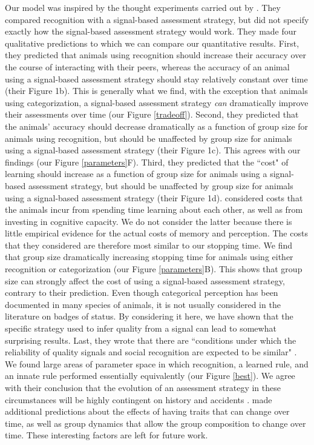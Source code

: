Our model was inspired by the thought experiments carried out by \citet{sheehan2016evotradeoff}. They compared recognition with a signal-based assessment strategy, but did not specify exactly how the signal-based assessment strategy would work. They made four qualitative predictions to which we can compare our quantitative results. First, they predicted that animals using recognition should increase their accuracy over the course of interacting with their peers, whereas the accuracy of an animal using a signal-based assessment strategy should stay relatively constant over time (their Figure 1b). This is generally what we find, with the exception that animals using categorization, a signal-based assessment strategy \emph{can} dramatically improve their assessments over time (our Figure \ref{tradeoff}). Second, they predicted that the animals' accuracy should decrease dramatically as a function of group size for animals using recognition, but should be unaffected by group size for animals using a signal-based assessment strategy (their Figure 1c). This agrees with our findings (our Figure \ref{parameters}F). Third, they predicted that the ``cost" of learning should increase as a function of group size for animals using a signal-based assessment strategy, but should be unaffected by group size for animals using a signal-based assessment strategy (their Figure 1d). \citet{sheehan2016evotradeoff} considered costs that the animals incur from spending time learning about each other, as well as from investing in cognitive capacity. We do not consider the latter because there is little empirical evidence for the actual costs of memory and perception. The costs that they considered are therefore most similar to our stopping time. We find that group size dramatically increasing stopping time for animals using either recognition or categorization (our Figure \ref{parameters}B). This shows that group size can strongly affect the cost of using a signal-based assessment strategy, contrary to their prediction. Even though categorical perception has been documented in many species of animals, it is not usually considered in the literature on badges of status. By considering it here, we have shown that the specific strategy used to infer quality from a signal can lead to somewhat surprising results. Last, they wrote that there are ``conditions under which the reliability of quality signals and social recognition are expected to be similar" \citep{sheehan2016evotradeoff}. We found large areas of parameter space in which recognition, a learned rule, and an innate rule performed essentially equivalently (our Figure \ref{best}). We agree with their conclusion that the evolution of an assessment strategy in these circumstances will be highly contingent on history and accidents \citep{sheehan2016evotradeoff}. \citet{sheehan2016evotradeoff} made additional predictions about the effects of having traits that can change over time, as well as group dynamics that allow the group composition to change over time. These interesting factors are left for future work.

